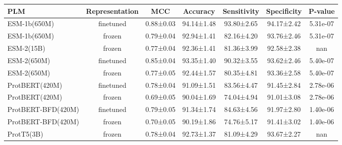 \begin{tabular}{lcccccc}
\toprule
               PLM & Representation &       MCC &   Accuracy & Sensitivity & Specificity &  P-value \\
\midrule
      ESM-1b(650M) &      finetuned & 0.88±0.03 & 94.14±1.48 &  93.80±2.65 &  94.17±2.42 & 5.31e-07 \\
      ESM-1b(650M) &         frozen & 0.79±0.04 & 92.94±1.41 &  82.16±4.20 &  93.76±2.46 & 5.31e-07 \\
        ESM-2(15B) &         frozen & 0.77±0.04 & 92.36±1.41 &  81.36±3.99 &  92.58±2.38 &      nan \\
       ESM-2(650M) &      finetuned & 0.85±0.04 & 93.35±1.40 &  90.32±3.55 &  93.62±2.46 & 5.40e-07 \\
       ESM-2(650M) &         frozen & 0.77±0.05 & 92.44±1.57 &  80.35±4.81 &  93.36±2.58 & 5.40e-07 \\
    ProtBERT(420M) &      finetuned & 0.78±0.04 & 91.09±1.51 &  83.56±4.47 &  91.45±2.84 & 2.78e-06 \\
    ProtBERT(420M) &         frozen & 0.69±0.05 & 90.04±1.69 &  74.04±4.94 &  91.01±3.08 & 2.78e-06 \\
ProtBERT-BFD(420M) &      finetuned & 0.79±0.05 & 91.34±1.74 &  84.63±4.56 &  91.97±2.80 & 1.40e-06 \\
ProtBERT-BFD(420M) &         frozen & 0.70±0.05 & 90.19±1.86 &  74.76±5.17 &  91.41±3.02 & 1.40e-06 \\
        ProtT5(3B) &         frozen & 0.78±0.04 & 92.73±1.37 &  81.09±4.29 &  93.67±2.27 &      nan \\
\bottomrule
\end{tabular}
